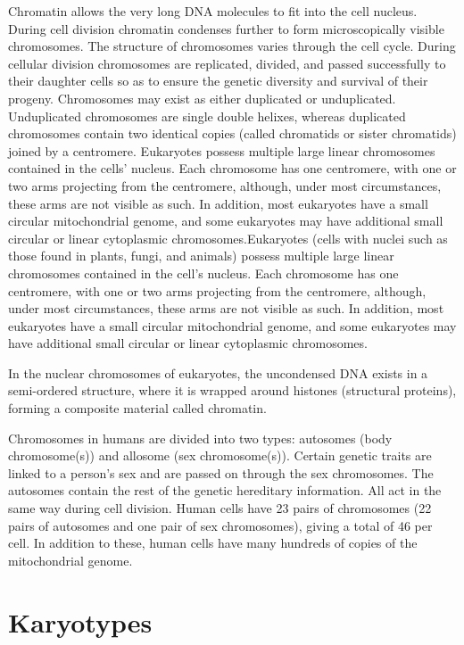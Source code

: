 \documentclass[]{book}
\begin{document}
Chromatin allows the very long DNA molecules to fit into the cell nucleus. During cell division chromatin condenses further to form microscopically visible chromosomes. The structure of chromosomes varies through the cell cycle. During cellular division chromosomes are replicated, divided, and passed successfully to their daughter cells so as to ensure the genetic diversity and survival of their progeny. Chromosomes may exist as either duplicated or unduplicated. Unduplicated chromosomes are single double helixes, whereas duplicated chromosomes contain two identical copies (called chromatids or sister chromatids) joined by a centromere. Eukaryotes possess multiple large linear chromosomes contained in the cells' nucleus. Each chromosome has one centromere, with one or two arms projecting from the centromere, although, under most circumstances, these arms are not visible as such. In addition, most eukaryotes have a small circular mitochondrial genome, and some eukaryotes may have additional small circular or linear cytoplasmic chromosomes.Eukaryotes (cells with nuclei such as those found in plants, fungi, and animals) possess multiple large linear chromosomes contained in the cell's nucleus. Each chromosome has one centromere, with one or two arms projecting from the centromere, although, under most circumstances, these arms are not visible as such. In addition, most eukaryotes have a small circular mitochondrial genome, and some eukaryotes may have additional small circular or linear cytoplasmic chromosomes.

In the nuclear chromosomes of eukaryotes, the uncondensed DNA exists in a semi-ordered structure, where it is wrapped around histones (structural proteins), forming a composite material called chromatin.

Chromosomes in humans are divided into two types: autosomes (body chromosome(s)) and allosome (sex chromosome(s)). Certain genetic traits are linked to a person's sex and are passed on through the sex chromosomes. The autosomes contain the rest of the genetic hereditary information. All act in the same way during cell division. Human cells have 23 pairs of chromosomes (22 pairs of autosomes and one pair of sex chromosomes), giving a total of 46 per cell. In addition to these, human cells have many hundreds of copies of the mitochondrial genome.

\hypertarget{karyotypes}{%
\section{Karyotypes}\label{karyotypes}}
\end{document}
